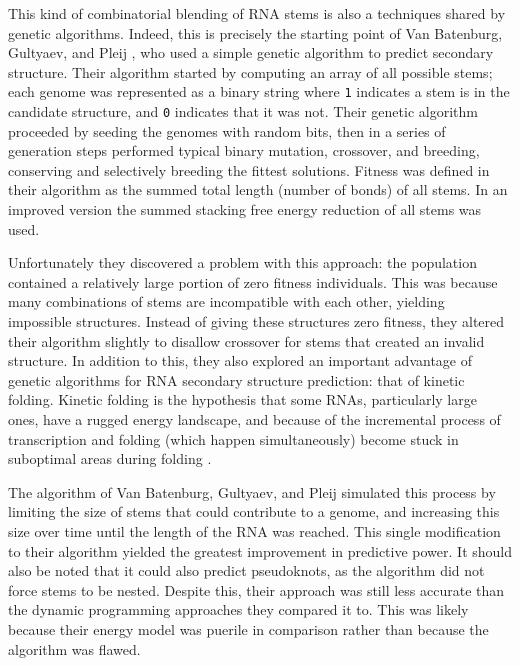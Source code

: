 \documentclass{cshonours}
\begin{document}
This kind of combinatorial blending of RNA stems is also a techniques shared by genetic algorithms. Indeed, this
is precisely the starting point of Van Batenburg, Gultyaev, and Pleij \cite{van1995apl}, who
used a simple genetic algorithm to predict secondary structure. Their algorithm
started by computing an array of all possible stems; each genome was represented
as a binary string where \texttt{1} indicates a stem is in the candidate structure, and \texttt{0}
indicates that it was not. Their genetic algorithm proceeded by seeding the genomes
with random bits, then in a series of generation steps performed typical binary
mutation, crossover, and breeding, conserving and selectively breeding the fittest
solutions. Fitness was defined in their algorithm as the summed total length
(number of bonds) of all stems. In an improved version the summed stacking
free energy reduction of all stems was used.

Unfortunately they discovered a problem with this approach: the population
contained a relatively large portion of zero fitness individuals. This was because
many combinations of stems are incompatible with each other, yielding impossible
structures. Instead of giving these structures zero fitness, they altered their algorithm slightly to disallow crossover for stems that created an invalid structure.
In addition to this, they also explored an important advantage of genetic algorithms for RNA secondary structure prediction: that of kinetic folding. Kinetic
folding is the hypothesis that some RNAs, particularly large ones, have a rugged
energy landscape, and because of the incremental process of transcription and
folding (which happen simultaneously) become stuck in suboptimal areas during
folding \cite{treiber2001beyond, van1995apl}. 

The algorithm of Van Batenburg, Gultyaev, and Pleij simulated
this process by limiting the size of stems that could contribute to a genome, and
increasing this size over time until the length of the RNA was reached. This
single modification to their algorithm yielded the greatest improvement in predictive power. It should also be noted that it could also predict pseudoknots, as
the algorithm did not force stems to be nested. Despite this, their approach was
still less accurate than the dynamic programming approaches they compared it
to. This was likely because their energy model was puerile in comparison rather than because the algorithm was flawed.
\end{document}
